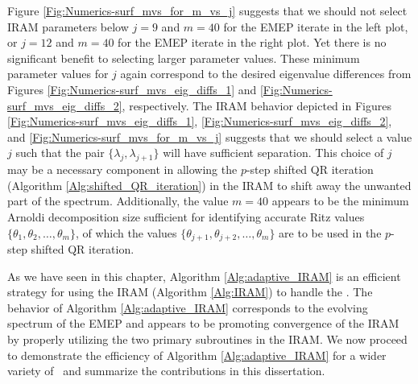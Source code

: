 Figure \ref{Fig:Numerics-surf_mvs_for_m_vs_j} suggests that we should not select IRAM parameters below $j = 9$ and $m = 40$ for the EMEP iterate in the left plot, or $j = 12$ and $m = 40$ for the EMEP iterate in the right plot.  
Yet there is no significant benefit to selecting larger parameter values.
These minimum parameter values for $j$ again correspond to the desired eigenvalue differences from Figures \ref{Fig:Numerics-surf_mvs_eig_diffs_1} and \ref{Fig:Numerics-surf_mvs_eig_diffs_2}, respectively.
The IRAM behavior depicted in Figures \ref{Fig:Numerics-surf_mvs_eig_diffs_1}, \ref{Fig:Numerics-surf_mvs_eig_diffs_2}, and \ref{Fig:Numerics-surf_mvs_for_m_vs_j} suggests that we should select a value $j$ such that the pair $\{ \lambda_j,  \lambda_{j+1} \}$ will have sufficient separation.
This choice of $j$ may be a necessary component in allowing the $p$-step shifted QR iteration (Algorithm \ref{Alg:shifted_QR_iteration}) in the IRAM to shift away the unwanted part of the spectrum.
Additionally, the value $m=40$ appears to be the minimum Arnoldi decomposition size sufficient for identifying accurate Ritz values $\{ \theta_{1}, \theta_{2}, \ldots, \theta_m \}$, of which the values $\{ \theta_{j+1}, \theta_{j+2}, \ldots, \theta_m \}$ are to be used in the $p$-step shifted QR iteration.







As we have seen in this chapter, Algorithm \ref{Alg:adaptive_IRAM} is an efficient strategy for using the IRAM (Algorithm \ref{Alg:IRAM}) to handle the \emep.  
The behavior of Algorithm \ref{Alg:adaptive_IRAM} corresponds to the evolving spectrum of the EMEP and appears to be promoting convergence of the IRAM by properly utilizing the two primary subroutines in the IRAM.
We now proceed to demonstrate the efficiency of Algorithm \ref{Alg:adaptive_IRAM} for a wider variety of \emeps \ and summarize the contributions in this dissertation.






